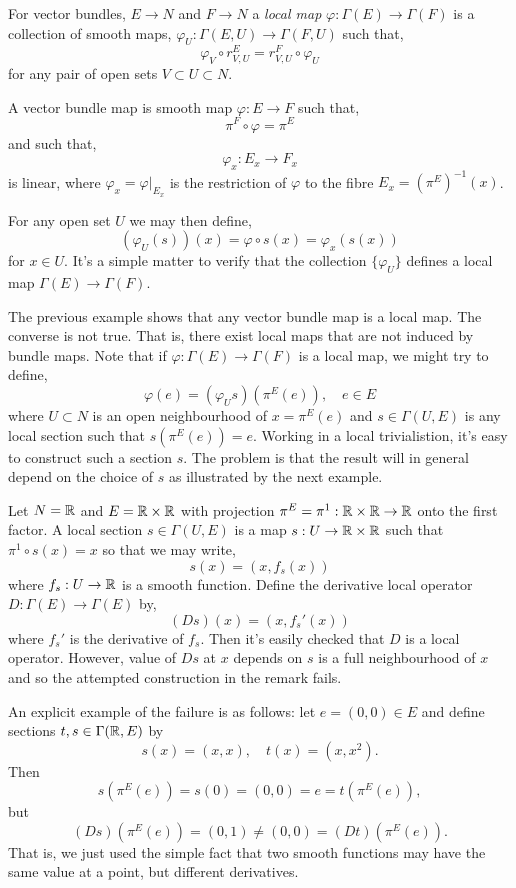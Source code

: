 \documentclass{amsart}
\begin{document}
\begin{defn}
For vector bundles, \(E \to N\) and \(F \to N\) a \emph{local map} \(\varphi : \Gamma(E) \to \Gamma(F)\) is a collection of smooth maps, \(\varphi_U : \Gamma(E, U) \to \Gamma(F, U)\) such that,
\[
\varphi_V \circ r^E_{V, U} = r^F_{V, U} \circ \varphi_U
\]
for any pair of open sets \(V \subset U \subset N\).
\end{defn}

\begin{example}
A vector bundle map is smooth map \(\varphi : E \to F\) such that,
\[
\pi^F \circ \varphi = \pi^E
\]
and such that,
\[
\varphi_x : E_x \to F_x
\]
is linear, where \(\varphi_x = \varphi|_{E_x}\) is the restriction of \(\varphi\) to the fibre \(E_x = (\pi^E)^{-1}(x)\).

For any open set \(U\) we may then define,
\[
(\varphi_U (s)) (x) = \varphi \circ s (x) = \varphi_x(s(x))
\]
for \(x \in U\). It's a simple matter to verify that the collection \(\{\varphi_U\}\) defines a local map \(\Gamma(E) \to \Gamma(F)\).
\end{example}

\begin{rem}
The previous example shows that any vector bundle map is a local map. The converse is not true. That is, there exist local maps that are not induced by bundle maps. Note that if \(\varphi : \Gamma(E) \to \Gamma(F)\) is a local map, we might try to define,
\[
\varphi(e) = (\varphi_U s) (\pi^E(e)), \quad e \in E
\]
where \(U \subset N\) is an open neighbourhood of \(x = \pi^E(e)\) and \(s \in \Gamma(U, E)\) is any local section such that \(s(\pi^E(e)) = e\). Working in a local trivialistion, it's easy to construct such a section \(s\). The problem is that the result will in general depend on the choice of \(s\) as illustrated by the next example.
\end{rem}

\begin{example}
Let \(N = \mathbb{R}\) and \(E = \mathbb{R} \times \mathbb{R}\) with projection \(\pi^E = \pi^1 : \mathbb{R} \times \mathbb{R} \to \mathbb{R}\) onto the first factor. A local section \(s \in \Gamma(U, E)\) is a map \(s : U \to \mathbb{R} \times \mathbb{R}\) such that \(\pi^1 \circ s (x) = x\) so that we may write,
\[
s(x) = (x, f_s(x))
\]
where \(f_s : U \to \mathbb{R}\) is a smooth function. Define the derivative local operator \(D : \Gamma(E) \to \Gamma(E)\) by,
\[
(D s) (x) = (x, f_s'(x))
\]
where \(f_s'\) is the derivative of \(f_s\). Then it's easily checked that \(D\) is a local operator. However, value of \(D s\) at \(x\) depends on \(s\) is a full neighbourhood of \(x\) and so the attempted construction in the remark fails.

An explicit example of the failure is as follows: let \(e = (0, 0) \in E\) and define sections \(t,s \in \Gamma(\mathbb{R}, E)\) by
\[
s(x) = (x, x), \quad t(x) = (x, x^2).
\]
Then
\[
s(\pi^E(e)) = s(0) = (0,0) = e = t(\pi^E(e)),
\]
but
\[
(D s) (\pi^E(e)) = (0, 1) \ne (0, 0) = (D t) (\pi^E(e)).
\]
That is, we just used the simple fact that two smooth functions may have the same value at a point, but different derivatives.
\end{example}
\end{document}
